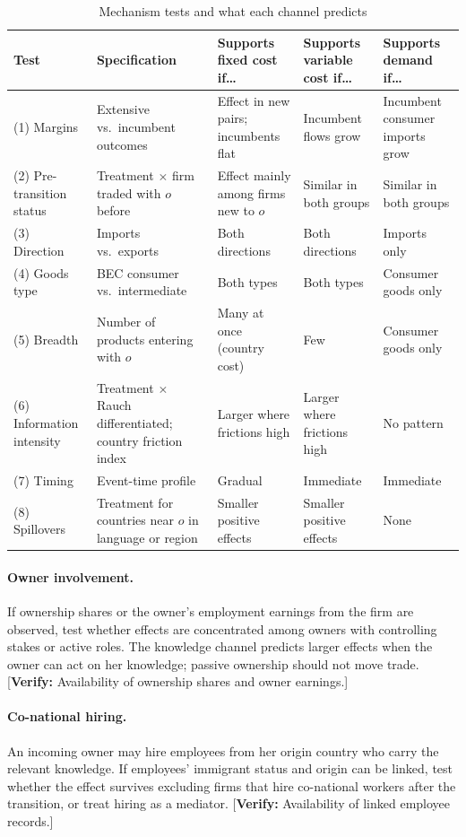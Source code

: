 \documentclass[12pt]{article}
\theoremstyle{remark}
\newcommand{\verify}[1]{\textcolor{BrickRed}{[\textbf{Verify:} #1]}}
\newcommand{\planned}[1]{\textcolor{OliveGreen}{#1}}
\begin{document}
\begin{table}[htbp]\centering\footnotesize
\caption{Mechanism tests and what each channel predicts}
\label{tab:mechtests}
\renewcommand{\arraystretch}{1.2}
\begin{tabularx}{\textwidth}{>{\raggedright\arraybackslash}p{2.4cm}>{\raggedright\arraybackslash}p{3.2cm}YYY}
\toprule
Test & Specification & Supports fixed cost if\ldots & Supports variable cost if\ldots & Supports demand if\ldots\\
\midrule
(1) Margins & Extensive vs.\ incumbent outcomes & Effect in new pairs; incumbents flat & Incumbent flows grow & Incumbent consumer imports grow\\
(2) Pre-transition status & Treatment $\times$ firm traded with $o$ before & Effect mainly among firms new to $o$ & Similar in both groups & Similar in both groups\\
(3) Direction & Imports vs.\ exports & Both directions & Both directions & Imports only\\
(4) Goods type & BEC consumer vs.\ intermediate & Both types & Both types & Consumer goods only\\
(5) Breadth & Number of products entering with $o$ & Many at once (country cost) & Few & Consumer goods only\\
(6) Information intensity & Treatment $\times$ Rauch differentiated; country friction index & Larger where frictions high & Larger where frictions high & No pattern\\
(7) Timing & Event-time profile & Gradual & Immediate & Immediate\\
(8) Spillovers & Treatment for countries near $o$ in language or region & Smaller positive effects & Smaller positive effects & None\\
\bottomrule
\end{tabularx}
\end{table}

\paragraph{Owner involvement.} \planned{If ownership shares or the owner's
employment earnings from the firm are observed, test whether effects are
concentrated among owners with controlling stakes or active roles. The
knowledge channel predicts larger effects when the owner can act on her
knowledge; passive ownership should not move trade. \verify{Availability of
ownership shares and owner earnings.}}

\paragraph{Co-national hiring.} \planned{An incoming owner may hire employees
from her origin country who carry the relevant knowledge. If employees'
immigrant status and origin can be linked, test whether the effect survives
excluding firms that hire co-national workers after the transition, or treat
hiring as a mediator. \verify{Availability of linked employee records.}}
\end{document}
